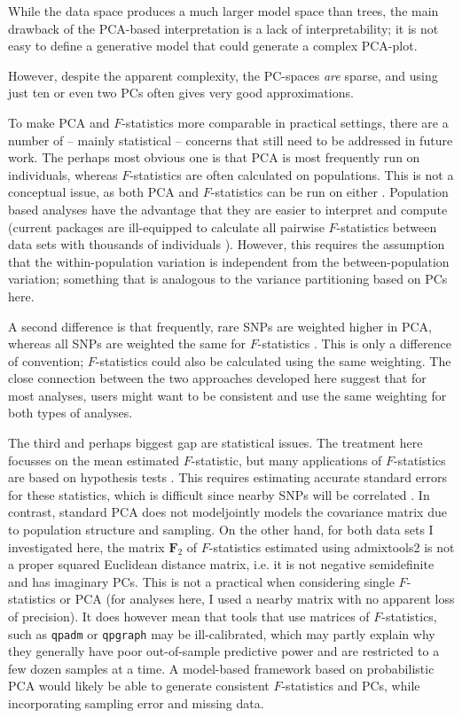 \documentclass[12pt,a4pape, fullpage]{article}
\newcommand{\MF}{\mathbf{F}_2} %
\begin{document}
While the data space produces a much larger model space than trees, the main drawback of the PCA-based interpretation is a lack of interpretability; it is not easy to define a generative model that could generate a complex PCA-plot. 

 However, despite the apparent complexity, the PC-spaces \emph{are} sparse, and using just ten or even two PCs often gives very good approximations.






To make PCA and $F$-statistics more comparable in practical settings, there are a number of -- mainly statistical -- concerns that still need to be addressed in future work. The perhaps most obvious one is that PCA is most frequently run on individuals, whereas $F$-statistics are often calculated on populations. This is not a conceptual issue, as both PCA and $F$-statistics can be run on either \cite{cavalli-sforza1994}. Population based analyses have the advantage that they are easier to interpret and compute (current packages are ill-equipped to calculate all pairwise $F$-statistics between data sets with thousands of individuals \cite{patterson2012}). However, this requires the assumption that the within-population variation is independent from the between-population variation; something that is analogous to the variance partitioning based on PCs here. 

A second difference is that frequently, rare SNPs are weighted higher in PCA, whereas all SNPs are weighted the same for $F$-statistics \cite{patterson2006}. This is only a difference of convention; $F$-statistics could also be calculated using the same weighting. The close connection between the two approaches developed here suggest that for most analyses, users might want to be consistent and use the same weighting for both types of analyses. 

The third and perhaps biggest gap are statistical issues. The treatment here focusses on the mean estimated $F$-statistic, but many  applications of $F$-statistics are based on hypothesis tests \cite{patterson2012}. This requires estimating accurate standard errors for these statistics, which is difficult since nearby SNPs will be correlated \cite{hahn2019}. In contrast, standard PCA does not modeljointly models the covariance matrix due to population structure and sampling. On the other hand, for both data sets I investigated here, the matrix $\MF$ of $F$-statistics estimated using admixtools2 is not a proper squared Euclidean distance matrix, i.e. it is not negative semidefinite and has imaginary PCs. This is not a practical when considering single $F$-statistics or PCA (for analyses here, I used a nearby matrix  \citep{higham2002} with no apparent loss of precision). It does however mean that tools that use matrices of $F$-statistics, such as \texttt{qpadm} or \texttt{qpgraph} may be ill-calibrated, which may partly explain why they generally have poor out-of-sample predictive power and are restricted to a few dozen samples at a time. A model-based framework based on probabilistic PCA \citep{meisner2021, agrawal2020, softimpute} would likely be able to generate consistent $F$-statistics and PCs, while incorporating sampling error and missing data.
\end{document}
